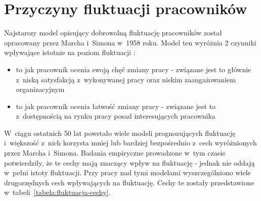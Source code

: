 \clearpage
\section{Przyczyny fluktuacji pracowników}\label{sec:czynniki-wplywajace-na-fluktuacje}

Najstarszy model opisujący dobrowolną fluktuację pracowników został opracowany przez Marcha i~Simona w~1958 roku.
Model ten wyróżnia 2 czynniki wpływające istotnie na poziom fluktuacji \cite{wozniak-2012}:
\begin{itemize}
    \item to jak pracownik ocenia swoją chęć zmiany pracy - związane jest to głównie z~niską satysfakcją z~wykonywanej pracy oraz niskim zaangażowaniem organizacyjnym
    \item to jak pracownik ocenia łatwość zmiany pracy - związane jest to z~dostępnością na rynku pracy posad interesujących pracownika
\end{itemize}

W~ciągu ostatnich 50 lat powstało wiele modeli prognozujących fluktuację i~większość z~nich korzysta mniej lub bardziej bezpośrednio z~cech wyróżnionych przez Marcha i~Simona.
Badania empiryczne prowadzone w~tym czasie potwierdziły, że te cechy mają znaczący wpływ na fluktuację - jednak nie oddają w~pełni istoty fluktuacji.
Przy pracy nad tymi modelami wyszczególniono wiele drugorzędnych cech wpływających na fluktuację.
Cechy te zostały przedstawione w~tabeli~\ref{tabela:fluktuacja-cechy}.

